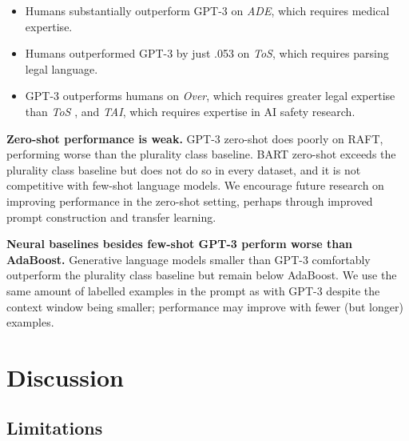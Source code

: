 \documentclass{article}
\newcommand{\name}{\textsc{RAFT}}
\begin{document}
\begin{itemize}
    \item Humans substantially outperform GPT-3 on \textit{ADE}, which requires medical expertise.
    \item Humans outperformed GPT-3 by just .053 on \textit{ToS}, which requires parsing legal language.
    \item GPT-3 outperforms humans on \textit{Over}, which requires greater legal expertise than \textit{ToS} \citep{zheng2021does}, and \textit{TAI}, which requires expertise in AI safety research.
\end{itemize}

\textbf{Zero-shot performance is weak.} GPT-3 zero-shot does poorly on \name{}, performing worse than the plurality class baseline. BART zero-shot exceeds the plurality class baseline but does not do so in every dataset, and it is not competitive with few-shot language models. We encourage future research on improving performance in the zero-shot setting, perhaps through improved prompt construction and transfer learning.

\textbf{Neural baselines besides few-shot GPT-3 perform worse than AdaBoost.} Generative language models smaller than GPT-3 comfortably outperform the plurality class baseline but remain below AdaBoost. We use the same amount of labelled examples in the prompt as with GPT-3 despite the context window being smaller; performance may improve with fewer (but longer) examples.

\section{Discussion}

\begin{comment}
Stronger human baselines
[Maybe: More experimental baselines]
[Maybe: More datasets]
More exploration on learning from natural language rather than examples
    Instructions, feedback, explanations
    Zero-shot benchmark?
tasks besides classification
Version with more robust evaluation
Varying levels of training examples, as in applied setting
Some bias in tasks toward Ought’s setting: AI-related tasks

Could decompose into limitations for
- tasks
- evaluation setup
- baselines
\end{comment}
\subsection{Limitations}
\end{document}
